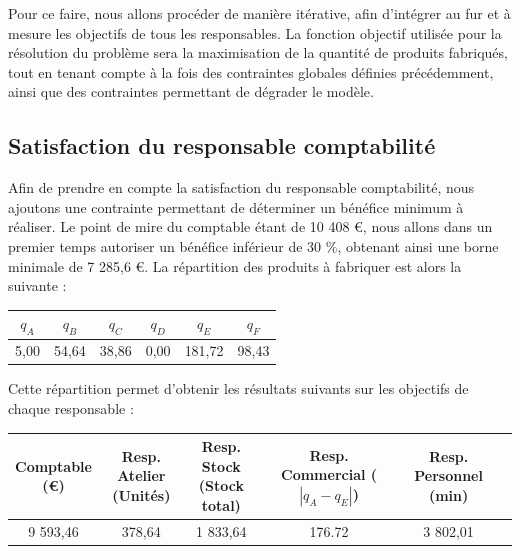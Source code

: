 \documentclass[paper=a4, fontsize=11pt]{report}
\numberwithin{equation}{section}		%
\numberwithin{figure}{section}			%
\numberwithin{table}{section}				%
\newcommand\abs[1]{\left|#1\right|}
\begin{document}
Pour ce faire, nous allons procéder de manière itérative, afin d'intégrer au fur et à mesure les objectifs de tous les responsables. La fonction objectif utilisée pour la résolution du problème sera la maximisation de la quantité de produits fabriqués, tout en tenant compte à la fois des contraintes globales définies précédemment, ainsi que des contraintes permettant de dégrader le modèle. 

\subsection{Satisfaction du responsable comptabilité}

Afin de prendre en compte la satisfaction du responsable comptabilité, nous ajoutons une contrainte permettant de déterminer un bénéfice minimum à réaliser. Le point de mire du comptable étant de 10 408 €, nous allons dans un premier temps autoriser un bénéfice inférieur de 30 \%, obtenant ainsi une borne minimale de 7 285,6 €. La répartition des produits à fabriquer est alors la suivante :

\begin{center}
\begin{tabular}{cccccc}
\hline
$q_A$ & $q_B$ & $q_C$ & $q_D$ & $q_E$ & $q_F$ \\
\hline
5,00 & 54,64 & 38,86 & 0,00 & 181,72 & 98,43 \\
\hline
\end{tabular}
\end{center}

Cette répartition permet d'obtenir les résultats suivants sur les objectifs de chaque responsable : 

\begin{table}[H]
\begin{center}
\begin{tabular}{c|ccccc}
\shortstack{Comptable \\ \scriptsize{(€)}} & \shortstack{Resp. Atelier \\ \scriptsize (Unités)} & \shortstack{Resp. Stock \\ \scriptsize (Stock total)} & \shortstack{Resp. Commercial \\ \scriptsize ($\abs{q_A - q_E}$)} &   \shortstack{Resp.  Personnel \\ \scriptsize (min)} \\ 
\hline 
9 593,46 & 378,64 & 1 833,64 & 176.72 & 3 802,01 \\ 
\end{tabular}
\end{center}
\end{table}
\end{document}
